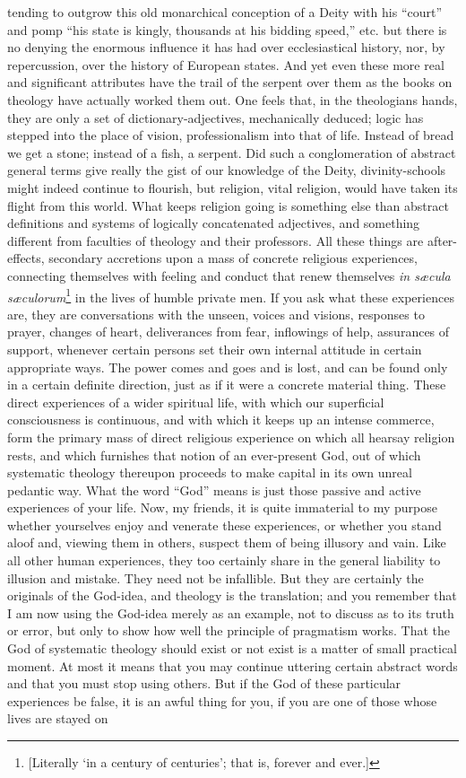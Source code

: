 \documentclass[12pt]{article}
\begin{document}
tending to outgrow this old monarchical conception of a Deity with his ``court'' and pomp ``his state is kingly, thousands at his bidding speed,'' etc. but there is no denying the enormous influence it has had over ecclesiastical history, nor, by repercussion, over the history of European states. And yet even these more real and significant attributes have the trail of the serpent over them as the books on theology have actually worked them out. One feels that, in the theologians hands, they are only a set of dictionary-adjectives, mechanically deduced; logic has stepped into the place of vision, professionalism into that of life. Instead of bread we get a stone; instead of a fish, a serpent. Did such a conglomeration of abstract general terms give really the gist of our knowledge of the Deity, divinity-schools might indeed continue to flourish, but religion, vital religion, would have taken its flight from this world. What keeps religion going is something else than abstract definitions and systems of logically concatenated adjectives, and something different from faculties of theology and their professors. All these things are after-effects, secondary accretions upon a mass of concrete religious experiences, connecting themselves with feeling and conduct that renew themselves \emph{in s{\ae}cula s{\ae}culorum}\footnote{[Literally `in a century of centuries'; that is, forever and ever.]} in the lives of humble private men. If you ask what these experiences are, they are conversations with the unseen, voices and visions, responses to prayer, changes of heart, deliverances from fear, inflowings of help, assurances of support, whenever certain persons set their own internal attitude in certain appropriate ways. The power comes and goes and is lost, and can be found only in a certain definite direction, just as if it were a concrete material thing. These direct experiences of a wider spiritual life, with which our superficial consciousness is continuous, and with which it keeps up an intense commerce, form the primary mass of direct religious experience on which all hearsay religion rests, and which furnishes that notion of an ever-present God, out of which systematic theology thereupon proceeds to make capital in its own unreal pedantic way. What the word ``God'' means is just those passive and active experiences of your life. Now, my friends, it is quite immaterial to my purpose whether yourselves enjoy and venerate these experiences, or whether you stand aloof and, viewing them in others, suspect them of being illusory and vain. Like all other human experiences, they too certainly share in the general liability to illusion and mistake. They need not be infallible. But they are certainly the originals of the God-idea, and theology is the translation; and you remember that I am now using the God-idea merely as an example, not to discuss as to its truth or error, but only to show how well the principle of pragmatism works. That the God of systematic theology should exist or not exist is a matter of small practical moment. At most it means that you may continue uttering certain abstract words and that you must stop using others. But if the God of these particular experiences be false, it is an awful thing for you, if you are one of those whose lives are stayed on 
\end{document}
